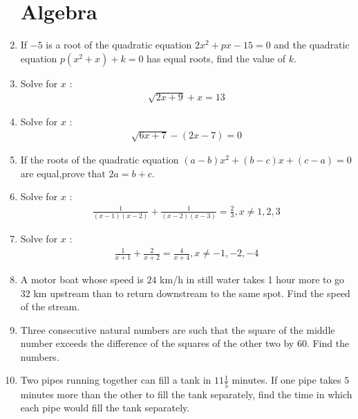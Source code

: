 \documentclass[12pt,-letter paper]{article}
\theoremstyle{remark}
\providecommand{\brak}[1]{\ensuremath{\left(#1\right)}}
\begin{document}
\begin{enumerate}
\section{Algebra}
\item If $-5$ is a root of the quadratic equation $2x^2+px-15=0$ and the quadratic equation $p\brak{x^2+x}+k=0 $ has equal roots, find the value of $k$. \\
\item Solve for $x$ : 
\begin{align*}\sqrt{2x+9} + x = 13\end{align*}
\item Solve for $x$ :
\begin{align*}\sqrt{6x+7}-\brak{2x-7}= 0\end{align*}
\item If the roots of the quadratic equation $\brak{a-b}x^2+\brak{b-c}x+\brak{c-a}=0$ are equal,prove that $2a=b+c$.\\
\item  Solve for $ x$ :  \begin{align*} \frac{1}{\brak{x-1}\brak{x-2}}  +  \frac{1}{\brak{x-2}\brak{x-3}}  =  \frac{2}{3} , x \neq 1,2,3\end{align*}
\item  Solve for $ x$ :  \begin{align*} \frac{1}{x+1}  + \frac{2}{x+2}  = \frac{4}{x+4} , x \neq -1,-2,-4 \end{align*} 
\item A motor boat whose speed is $24$ km/h in still water takes 1 hour more to go $32$ km upstream than to return downstream to the same spot. Find the speed of the stream.\\
\item Three consecutive natural numbers are such that the square of the middle number exceeds the difference of the squares of the other two by $60$. Find the numbers.\\
\item Two pipes running together can fill a tank in $11\frac{1}{5}$ minutes. If one pipe takes $5$ minutes more than the other to fill the tank separately, find the time in which each pipe would fill the tank separately.\\


\end{enumerate}
\end{document}

